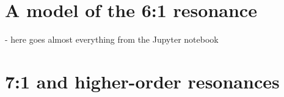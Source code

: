 \section{A model of the 6:1 resonance}
\label{sec:6_by_1_resonance}
- here goes almost everything from the Jupyter notebook

\section{7:1 and higher-order resonances}
\label{sec:7:1 and higher-order resonances}
